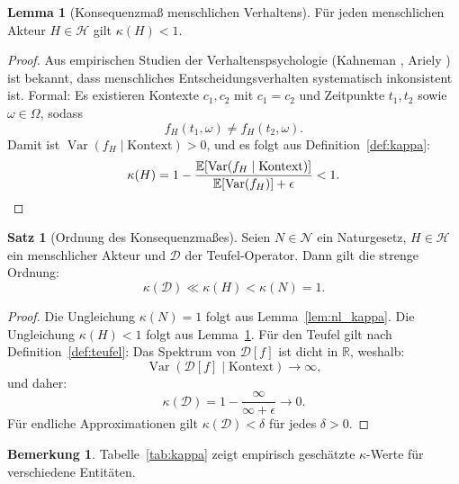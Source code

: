 ﻿\documentclass[a4paper,12pt]{article}
\DeclareMathOperator{\Var}{Var}
\theoremstyle{definition}
\newtheorem{satz}{Satz}
\newtheorem{lemma}{Lemma}
\newtheorem{bemerkung}{Bemerkung}
\begin{document}
\begin{lemma}[Konsequenzmaß menschlichen Verhaltens]
\label{lem:human_kappa}
Für jeden menschlichen Akteur $H \in \mathcal{H}$ gilt $\kappa(H) < 1$.
\end{lemma}

\begin{proof}
Aus empirischen Studien der Verhaltenspsychologie (Kahneman \cite{kahneman2011}, Ariely \cite{ariely2008}) ist bekannt, dass menschliches Entscheidungsverhalten systematisch inkonsistent ist. Formal: Es existieren Kontexte $c_1, c_2$ mit $c_1 = c_2$ und Zeitpunkte $t_1, t_2$ sowie $\omega \in \Omega$, sodass
\[
f_H(t_1, \omega) \neq f_H(t_2, \omega).
\]
Damit ist $\Var(f_H \mid \text{Kontext}) > 0$, und es folgt aus Definition~\ref{def:kappa}:
\[
\kappa(H) = 1 - \frac{\mathbb{E}[\Var(f_H \mid \text{Kontext})]}{\mathbb{E}[\Var(f_H)] + \epsilon} < 1. \qedhere
\]
\end{proof}

\begin{satz}[Ordnung des Konsequenzmaßes]
\label{satz:ordnung}
Seien $N \in \mathcal{N}$ ein Naturgesetz, $H \in \mathcal{H}$ ein menschlicher Akteur und $\mathcal{D}$ der Teufel-Operator. Dann gilt die strenge Ordnung:
\[
\kappa(\mathcal{D}) \ll \kappa(H) < \kappa(N) = 1.
\]
\end{satz}

\begin{proof}
Die Ungleichung $\kappa(N) = 1$ folgt aus Lemma~\ref{lem:nl_kappa}. Die Ungleichung $\kappa(H) < 1$ folgt aus Lemma~\ref{lem:human_kappa}. Für den Teufel gilt nach Definition~\ref{def:teufel}: Das Spektrum von $\mathcal{D}[f]$ ist dicht in $\mathbb{R}$, weshalb:
\[
\Var(\mathcal{D}[f] \mid \text{Kontext}) \to \infty,
\]
und daher:
\[
\kappa(\mathcal{D}) = 1 - \frac{\infty}{\infty + \epsilon} \to 0.
\]
Für endliche Approximationen gilt $\kappa(\mathcal{D}) < \delta$ für jedes $\delta > 0$. \qedhere
\end{proof}

\begin{bemerkung}
Tabelle~\ref{tab:kappa} zeigt empirisch geschätzte $\kappa$-Werte für verschiedene Entitäten.
\end{bemerkung}
\end{document}
